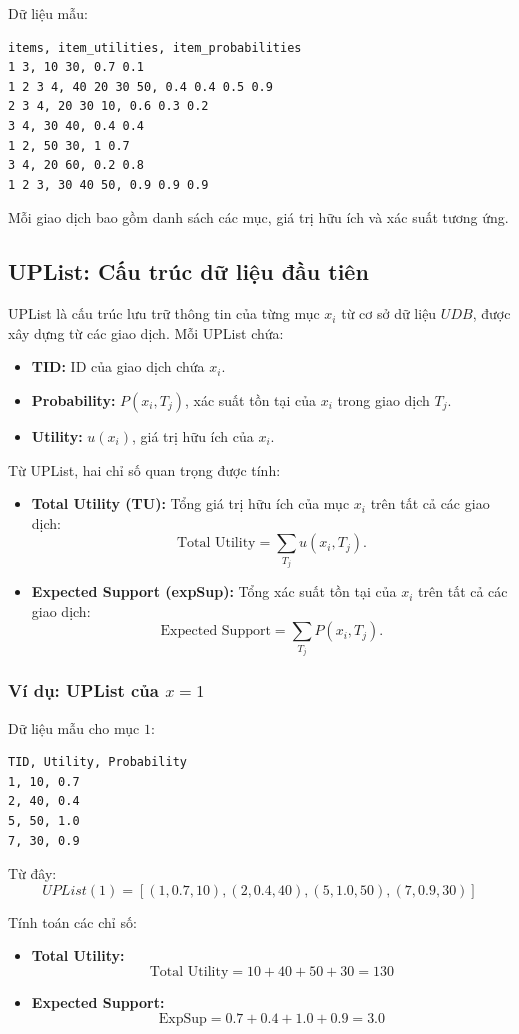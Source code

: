 \documentclass[conference]{IEEEtran}
\begin{document}
Dữ liệu mẫu:
\begin{verbatim}
items, item_utilities, item_probabilities
1 3, 10 30, 0.7 0.1
1 2 3 4, 40 20 30 50, 0.4 0.4 0.5 0.9
2 3 4, 20 30 10, 0.6 0.3 0.2
3 4, 30 40, 0.4 0.4
1 2, 50 30, 1 0.7
3 4, 20 60, 0.2 0.8
1 2 3, 30 40 50, 0.9 0.9 0.9
\end{verbatim}

Mỗi giao dịch bao gồm danh sách các mục, giá trị hữu ích và xác suất tương ứng.

\subsection{UPList: Cấu trúc dữ liệu đầu tiên}
UPList là cấu trúc lưu trữ thông tin của từng mục \(x_i\) từ cơ sở dữ liệu \(UDB\), được xây dựng từ các giao dịch. Mỗi UPList chứa:
\begin{itemize}
    \item \textbf{TID:} ID của giao dịch chứa \(x_i\).
    \item \textbf{Probability:} \(P(x_i, T_j)\), xác suất tồn tại của \(x_i\) trong giao dịch \(T_j\).
    \item \textbf{Utility:} \(u(x_i)\), giá trị hữu ích của \(x_i\).
\end{itemize}

Từ UPList, hai chỉ số quan trọng được tính:
\begin{itemize}
    \item \textbf{Total Utility (TU):} Tổng giá trị hữu ích của mục \(x_i\) trên tất cả các giao dịch:
    \[
    \text{Total Utility}= \sum_{T_j} u(x_i, T_j).
    \]
    \item \textbf{Expected Support (expSup):} Tổng xác suất tồn tại của \(x_i\) trên tất cả các giao dịch:
    \[
    \text{Expected Support} = \sum_{T_j} P(x_i, T_j).
    \]
\end{itemize}

\subsubsection{Ví dụ: UPList của \(x = 1\)}
Dữ liệu mẫu cho mục \(1\):
\begin{lstlisting}
TID, Utility, Probability
1, 10, 0.7
2, 40, 0.4
5, 50, 1.0
7, 30, 0.9
\end{lstlisting}

Từ đây:
\[
UPList(1) = [(1, 0.7, 10), (2, 0.4, 40), (5, 1.0, 50), (7, 0.9, 30)]
\]

Tính toán các chỉ số:
\begin{itemize}
    \item \textbf{Total Utility:}
    \[
    \text{Total Utility} = 10 + 40 + 50 + 30 = 130
    \]
    \item \textbf{Expected Support:}
    \[
    \text{ExpSup} = 0.7 + 0.4 + 1.0 + 0.9 = 3.0
    \]
\end{itemize}
\end{document}

